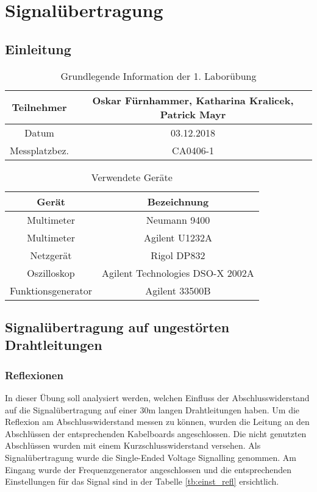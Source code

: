 \chapter{Signalübertragung}

\section{Einleitung}

\begin{table}[!h]
	\centering
	\begin{tabular}{|c|c|}
		\hline 
		Teilnehmer 		& Oskar Fürnhammer, Katharina Kralicek, Patrick Mayr \\
		\hline 
		Datum 		& 03.12.2018 \\ 
		\hline 
		Messplatzbez. 	& CA0406-1 \\
		\hline
	\end{tabular} 
	\caption{Grundlegende Information der 1. Laborübung}
\end{table}

\begin{table}[!h]
	\centering
	\begin{tabular}{ c | c }

Gerät				& Bezeichnung		\\
\hline

Multimeter			& Neumann 9400				\\
Multimeter			& Agilent U1232A				\\
Netzgerät			& Rigol DP832 				\\
Oszilloskop			& Agilent Technologies DSO-X 2002A 	\\
Funktionsgenerator		& Agilent 33500B 				\\

	\end{tabular}

	\caption{Verwendete Geräte}
\end{table}


\newpage

\section{Signalübertragung auf ungestörten Drahtleitungen}

\subsection{Reflexionen}

In dieser Übung soll analysiert werden, welchen Einfluss der Abschlusswiderstand auf die Signalübertragung auf einer 30m langen Drahtleitungen haben. Um die Reflexion am Abschlusswiderstand messen zu können, wurden die Leitung an den Abschlüssen der entsprechenden Kabelboards angeschlossen. Die nicht genutzten Abschlüssen wurden mit einem Kurzschlusswiderstand versehen. Als Signalübertragung wurde die Single-Ended Voltage Signalling genommen. Am Eingang wurde der Frequenzgenerator angeschlossen und die entsprechenden Einstellungen für das Signal sind in der Tabelle \ref{tb:einst_refl} ersichtlich. \\

